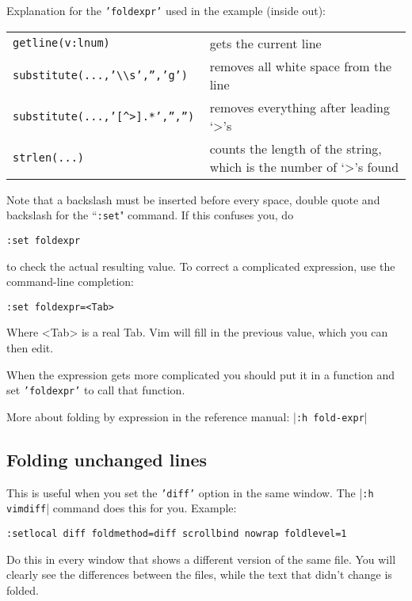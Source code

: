 Explanation for the \texttt{'foldexpr'} used in the example (inside out):
\begin{center} \begin{tabular}{l l}
				\texttt{getline(v:lnum) } & gets the current line \\
				\texttt{substitute(...,'\textbackslash{}\textbackslash{}s','','g') } & removes all white space from the line \\
				\texttt{substitute(...,'[\^{}>].*','','') } & removes everything after leading `>'s \\
				\texttt{strlen(...) } & counts the length of the string, which is the number of `>'s found \\
\end{tabular} \end{center}
Note that a backslash must be inserted before every space, double quote and backslash for the ``\texttt{:set}" command.
If this confuses you, do

\begin{Verbatim}[samepage=true]
 :set foldexpr
\end{Verbatim}

to check the actual resulting value.
To correct a complicated expression, use the command-line completion:

\begin{Verbatim}[samepage=true]
 :set foldexpr=<Tab>
\end{Verbatim}

Where <Tab> is a real Tab.
Vim will fill in the previous value, which you can then edit.

When the expression gets more complicated you should put it in a function and set \texttt{'foldexpr'} to call that function.

More about folding by expression in the reference manual: |\texttt{:h fold-expr}|
\subsection{Folding unchanged lines}
This is useful when you set the \texttt{'diff'} option in the same window.
The |\texttt{:h vimdiff}| command does this for you.
Example:

\begin{Verbatim}[samepage=true]
 :setlocal diff foldmethod=diff scrollbind nowrap foldlevel=1
\end{Verbatim}

Do this in every window that shows a different version of the same file.
You will clearly see the differences between the files, while the text that didn't change is folded.

